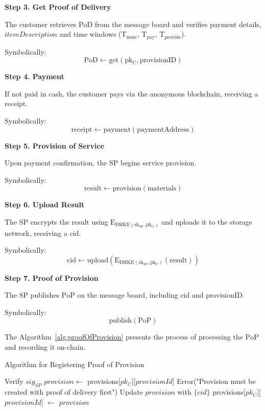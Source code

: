 \documentclass[pdftex,twocolumn,epjc3]{svjour3}
\begin{document}
\noindent \textbf{Step 3. Get Proof of Delivery}\label{step-3-get-pod}

The customer retrieves $\mathrm{PoD}$ from the message board and verifies payment details, $itemDescription$ and time windows ($\mathrm{T}_\mathrm{issue}$, $\mathrm{T}_\mathrm{pay}$, $\mathrm{T}_\mathrm{provide}$).

Symbolically: 
\[
\mathrm{PoD \gets get(pk_C, provisionID)}
\]

\noindent \textbf{Step 4. Payment}\label{step-4-payment}

If not paid in cash, the customer pays via the anonymous blockchain, receiving a $\mathrm{receipt}$.

Symbolically: 
\[
\mathrm{receipt \gets payment(paymentAddress)}
\]

\noindent \textbf{Step 5. Provision of Service}\label{step-5-provision-of-service} 

Upon payment confirmation, the SP begins service provision.

Symbolically: 
\[
\mathrm{result \gets provision(materials)}
\]

\noindent \textbf{Step 6. Upload Result}\label{step-6-upload-result}

The SP encrypts the $\mathrm{result}$ using $\mathrm{E_{DHKE(sk_{SP}, pk_C)}}$ and uploads it to the storage network, receiving a $\mathrm{cid}$.

Symbolically: 
\[
\mathrm{cid \gets upload(E_{DHKE(sk_{SP}, pk_C)}(result))}
\]

\noindent \textbf{Step 7. Proof of Provision}\label{step-7-proof-of-provision}

The SP publishes $\mathrm{PoP}$ on the message board, including $\mathrm{cid}$ and $\mathrm{provisionID}$.

Symbolically: 
\[
\mathrm{publish(PoP)}
\]

The Algorithm~\ref{alg:proofOfProvision} presents the process of processing the $\mathrm{PoP}$ and recording it on-chain.

\begin{algorithm}
\caption{Algorithm for Registering Proof of Provision}
\label{alg:proofOfProvision}
\begin{algorithmic}[1]
    \State Verify $sig_{SP}$
    \State $provision \gets$ provisions[$pk_C$][$provisionId$]
        \State \Return Error("Provision must be created with proof of delivery first")
    \EndIf
    \State Update $provision$ with $\{cid\}$
    \State provisions[$pk_C$][$provisionId$] $\gets$ $provision$
\EndFunction
\end{algorithmic}
\end{algorithm}
\end{document}
